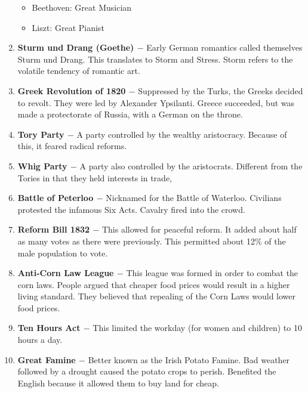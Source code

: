 \documentclass[12pt]{article}
\begin{document}
\begin{enumerate}
\begin{itemize}
\item Beethoven: Great Musician

\item Liszt: Great Pianist

\end{itemize}

\item \textbf{Sturm und Drang (Goethe) $-$} Early German romantics called themselves Sturm und Drang. This translates to Storm and Stress. Storm refers to the volatile tendency of romantic art.

\item \textbf{Greek Revolution of 1820 $-$} Suppressed by the Turks, the Greeks decided to revolt. They were led by Alexander Ypsilanti. Greece succeeded, but was made a protectorate of Russia, with a German on the throne.

\item \textbf{Tory Party $-$} A party controlled by the wealthy aristocracy. Because of this, it feared radical reforms.

\item \textbf{Whig Party $-$} A party also controlled by the aristocrats. Different from the Tories in that they held interests in trade,

\item \textbf{Battle of Peterloo $-$} Nicknamed for the Battle of Waterloo. Civilians protested the infamous Six Acts. Cavalry fired into the crowd.

\item \textbf{Reform Bill 1832 $-$} This allowed for peaceful reform. It added about half as many votes as there were previously. This permitted about 12\% of the male population to vote.

\item \textbf{Anti-Corn Law League $-$} This league was formed in order to combat the corn laws. People argued that cheaper food prices would result in a higher living standard. They believed that repealing of the Corn Laws would lower food prices.

\item \textbf{Ten Hours Act $-$} This limited the workday (for women and children) to 10 hours a day.

\item \textbf{Great Famine $-$} Better known as the Irish Potato Famine. Bad weather followed by a drought caused the potato crops to perish. Benefited the English because it allowed them to buy land for cheap.


\end{enumerate}
\end{document}
